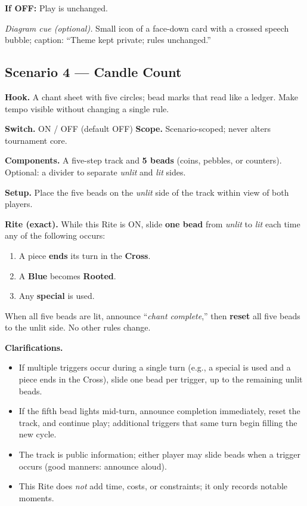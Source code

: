 \documentclass[11pt]{article}
\begin{document}
\medskip
\noindent\textbf{If \textsc{OFF}:} Play is unchanged.

\medskip
\noindent\textit{Diagram cue (optional).} Small icon of a face-down card with a crossed speech bubble; caption: “Theme kept private; rules unchanged.”

\subsection{Scenario 4 — Candle Count}
\label{scen:candle-count}

\noindent\textbf{Hook.} A chant sheet with five circles; bead marks that read like a ledger. Make tempo visible without changing a single rule.

\medskip
\noindent\textbf{Switch.} \textsc{ON / OFF} (default \textsc{OFF}) \hfill \textbf{Scope.} Scenario-scoped; never alters tournament core.

\medskip
\noindent\textbf{Components.} A five-step track and \textbf{5 beads} (coins, pebbles, or counters). Optional: a divider to separate \emph{unlit} and \emph{lit} sides.

\medskip
\noindent\textbf{Setup.} Place the five beads on the \emph{unlit} side of the track within view of both players.

\medskip
\noindent\textbf{Rite (exact).} While this Rite is \textsc{ON}, slide \textbf{one bead} from \emph{unlit} to \emph{lit} each time any of the following occurs:
\begin{enumerate}\setlength\itemsep{0.2em}
  \item A piece \textbf{ends} its turn in the \textbf{Cross}.
  \item A \textbf{Blue} becomes \textbf{Rooted}.
  \item Any \textbf{special} is used.
\end{enumerate}
When all five beads are lit, announce “\textit{chant complete},” then \textbf{reset} all five beads to the unlit side. No other rules change.

\medskip
\noindent\textbf{Clarifications.}
\begin{itemize}\setlength\itemsep{0.25em}
  \item If multiple triggers occur during a single turn (e.g., a special is used and a piece ends in the Cross), slide one bead per trigger, up to the remaining unlit beads.
  \item If the fifth bead lights mid-turn, announce completion immediately, reset the track, and continue play; additional triggers that same turn begin filling the new cycle.
  \item The track is public information; either player may slide beads when a trigger occurs (good manners: announce aloud).
  \item This Rite does \emph{not} add time, costs, or constraints; it only records notable moments.
\end{itemize}
\end{document}
